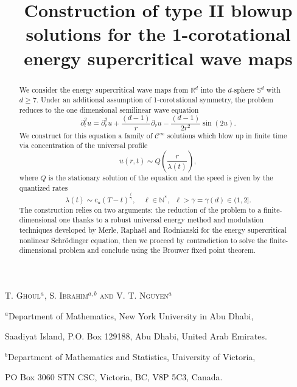 \documentclass[11pt]{aims}
\title[1-corotational energy supercritical wave maps] 
      {Construction of type II blowup solutions for the 1-corotational energy supercritical wave maps}
\author[T. Ghoul, S. Ibrahim,  and V. T. Nguyen]{}
\theoremstyle{definition}
\numberwithin{equation}{section}
\begin{document}
\maketitle

\centerline{\scshape T. Ghoul$^a$, S. Ibrahim$^{a,b}$  and V. T. Nguyen$^a$}
\medskip
{\footnotesize
 \centerline{$^a$Department of Mathematics, New York University in Abu Dhabi,}
   \centerline{Saadiyat Island, P.O. Box 129188, Abu Dhabi, United Arab Emirates.}
}
\medskip
{\footnotesize
 \centerline{$^b$Department of Mathematics and Statistics, University of Victoria,}
   \centerline{PO Box 3060 STN CSC, Victoria, BC, V8P 5C3, Canada.}
}

\bigskip

\begin{abstract} We consider the energy supercritical wave maps from ${\mathbb{R}}^d$ into the $d$-sphere $\mathbb{S}^d$ with $d \geq 7$. Under an additional assumption of 1-corotational symmetry, the problem reduces to the one dimensional semilinear wave equation
$$\partial_t^2 u = \partial^2_r u + \frac{(d-1)}{r}\partial_r u - \frac{(d-1)}{2r^2}\sin(2u).$$
We construct for this equation a family of $\mathcal{C}^{\infty}$ solutions which blow up in finite time  via concentration of the universal profile
$$u(r,t) \sim Q\left(\frac{r}{\lambda(t)}\right),$$
where $Q$ is the stationary solution of the equation and the speed is given by the quantized rates
$$\lambda(t) \sim c_u(T-t)^\frac{\ell}{\gamma}, \quad \ell \in \mathbb{N}^*, \;\; \ell > \gamma = \gamma(d) \in (1,2].$$
The construction relies on two arguments: the reduction of the problem to a finite-dimensional one thanks to a robust universal energy method and modulation techniques developed by Merle, Rapha\"el and Rodnianski \cite{MRRcjm15} for the energy supercritical nonlinear Schr\"odinger equation, then we proceed by contradiction to solve the finite-dimensional problem and conclude using the Brouwer fixed point theorem. 

\end{abstract}
\end{document}
